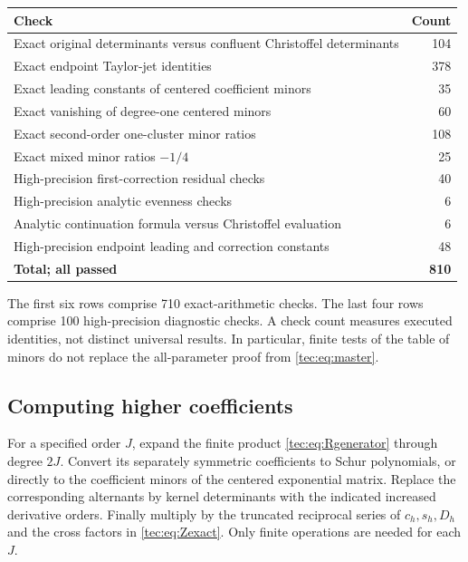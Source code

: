 \documentclass[11pt,a4paper]{article}
\numberwithin{equation}{section}
\theoremstyle{definition}
\theoremstyle{remark}
\begin{document}
\begin{center}\small
\begin{tabular}{@{}p{}r@{}}\toprule
Check & Count\\\midrule
Exact original determinants versus confluent Christoffel determinants &104\\
Exact endpoint Taylor-jet identities &378\\
Exact leading constants of centered coefficient minors &35\\
Exact vanishing of degree-one centered minors &60\\
Exact second-order one-cluster minor ratios &108\\
Exact mixed minor ratios $-1/4$ &25\\
High-precision first-correction residual checks &40\\
High-precision analytic evenness checks &6\\
Analytic continuation formula versus Christoffel evaluation &6\\
High-precision endpoint leading and correction constants &48\\\midrule
\textbf{Total; all passed} &\textbf{810}\\\bottomrule
\end{tabular}
\end{center}
The first six rows comprise 710 exact-arithmetic checks. The last four
rows comprise 100 high-precision diagnostic checks. A check count measures
executed identities, not distinct universal results. In particular,
finite tests of the table of minors do not replace the all-parameter
proof from \eqref{tec:eq:master}.

\subsection{Computing higher coefficients}
For a specified order $J$, expand the finite product
\eqref{tec:eq:Rgenerator} through degree $2J$. Convert its separately
symmetric coefficients to Schur polynomials, or directly to the
coefficient minors of the centered exponential matrix. Replace the
corresponding alternants by kernel determinants with the indicated
increased derivative orders. Finally multiply by the truncated reciprocal
series of $c_h,s_h,D_h$ and the cross factors in
\eqref{tec:eq:Zexact}. Only finite operations are needed for each $J$.
\end{document}

